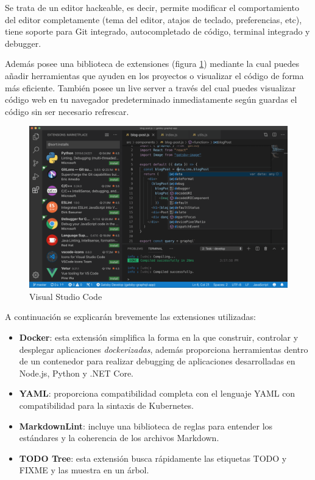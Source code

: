 Se trata de un editor hackeable, es decir, permite modificar el comportamiento del editor completamente (tema del editor, atajos de teclado, preferencias, etc), tiene soporte para Git integrado, autocompletado de código, terminal integrado y debugger.

Además posee una biblioteca de extensiones (figura \ref{fig:vscode}) mediante la cual puedes añadir herramientas que ayuden en los proyectos o visualizar el código de forma más eficiente. También posee un live server a través del cual puedes visualizar código web en tu navegador predeterminado inmediatamente según guardas el código sin ser necesario refrescar.

\begin{figure}[h]
    \centering
    \includegraphics[width=\textwidth]{include/figuras/VSCode.png}
    \caption{Visual Studio Code}
    \label{fig:vscode}
\end{figure}

A continuación se explicarán brevemente las extensiones utilizadas:

\begin{itemize}
    \item \textbf{Docker}: esta extensión simplifica la forma en la que construir, controlar y desplegar aplicaciones \textit{dockerizadas}, además proporciona herramientas dentro de un contenedor para realizar debugging de aplicaciones desarrolladas en Node.js, Python y .NET Core.
    \item \textbf{YAML}: proporciona compatibilidad completa con el lenguaje YAML con compatibilidad para la sintaxis de Kubernetes.
    \item \textbf{MarkdownLint}: incluye una biblioteca de reglas para entender los estándares y la coherencia de los archivos Markdown. 
    \item \textbf{TODO Tree}: esta extensión busca rápidamente las etiquetas TODO y FIXME y las muestra en un árbol. 
\end{itemize}


